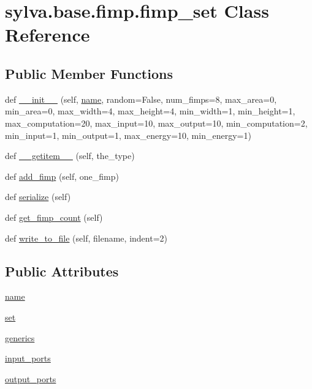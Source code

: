 \hypertarget{classsylva_1_1base_1_1fimp_1_1fimp__set}{}\section{sylva.\+base.\+fimp.\+fimp\+\_\+set Class Reference}
\label{classsylva_1_1base_1_1fimp_1_1fimp__set}
\subsection*{Public Member Functions}
\begin{DoxyCompactItemize}
\item 
def \hyperlink{classsylva_1_1base_1_1fimp_1_1fimp__set_ac9e5432efaba5bc24a3ad1ede9bfa670}{\+\_\+\+\_\+init\+\_\+\+\_\+} (self, \hyperlink{classsylva_1_1base_1_1fimp_1_1fimp__set_a6bd6ecb11789d4e76631517eca054821}{name}, random=False, num\+\_\+fimps=8, max\+\_\+area=0, min\+\_\+area=0, max\+\_\+width=4, max\+\_\+height=4, min\+\_\+width=1, min\+\_\+height=1, max\+\_\+computation=20, max\+\_\+input=10, max\+\_\+output=10, min\+\_\+computation=2, min\+\_\+input=1, min\+\_\+output=1, max\+\_\+energy=10, min\+\_\+energy=1)
\item 
def \hyperlink{classsylva_1_1base_1_1fimp_1_1fimp__set_ac60ac2361915c433b70be643b4406201}{\+\_\+\+\_\+getitem\+\_\+\+\_\+} (self, the\+\_\+type)
\item 
def \hyperlink{classsylva_1_1base_1_1fimp_1_1fimp__set_ab613d0c639c54bec78bb31b9f983ba80}{add\+\_\+fimp} (self, one\+\_\+fimp)
\item 
def \hyperlink{classsylva_1_1base_1_1fimp_1_1fimp__set_a5da0327838090a9ebd8e41dc5dec377b}{serialize} (self)
\item 
def \hyperlink{classsylva_1_1base_1_1fimp_1_1fimp__set_aec3d350eabf8a4f0b7e478c4e27caf53}{get\+\_\+fimp\+\_\+count} (self)
\item 
def \hyperlink{classsylva_1_1base_1_1fimp_1_1fimp__set_a080102d68047524f8e1bd07a4da97ca1}{write\+\_\+to\+\_\+file} (self, filename, indent=2)
\end{DoxyCompactItemize}
\subsection*{Public Attributes}
\begin{DoxyCompactItemize}
\item 
\hyperlink{classsylva_1_1base_1_1fimp_1_1fimp__set_a6bd6ecb11789d4e76631517eca054821}{name}
\item 
\hyperlink{classsylva_1_1base_1_1fimp_1_1fimp__set_ae1110f70c9087b003ef54d99f6eb8a83}{set}
\item 
\hyperlink{classsylva_1_1base_1_1fimp_1_1fimp__set_adc6c36ee3cf53a82b121bec2cbc58ab5}{generics}
\item 
\hyperlink{classsylva_1_1base_1_1fimp_1_1fimp__set_a7e0968ecfd04c497b681319bd7ac70e0}{input\+\_\+ports}
\item 
\hyperlink{classsylva_1_1base_1_1fimp_1_1fimp__set_ad27b4cf66a761b4ad12a2d490be1781c}{output\+\_\+ports}
\end{DoxyCompactItemize}
